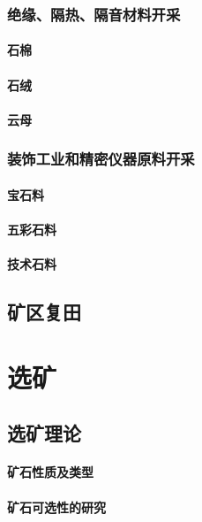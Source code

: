 \documentclass[UTF8]{../../ApplicationUniverse}
\begin{document}
    \subsection{绝缘、隔热、隔音材料开采}
        \subsubsection{石棉}
        \subsubsection{石绒}
        \subsubsection{云母}
    \subsection{装饰工业和精密仪器原料开采}
        \subsubsection{宝石料}
        \subsubsection{五彩石料}
        \subsubsection{技术石料}
\section{矿区复田}










\chapter{选矿}
\section{选矿理论}
    \subsubsection{矿石性质及类型}
    \subsubsection{矿石可选性的研究}
\end{document}
